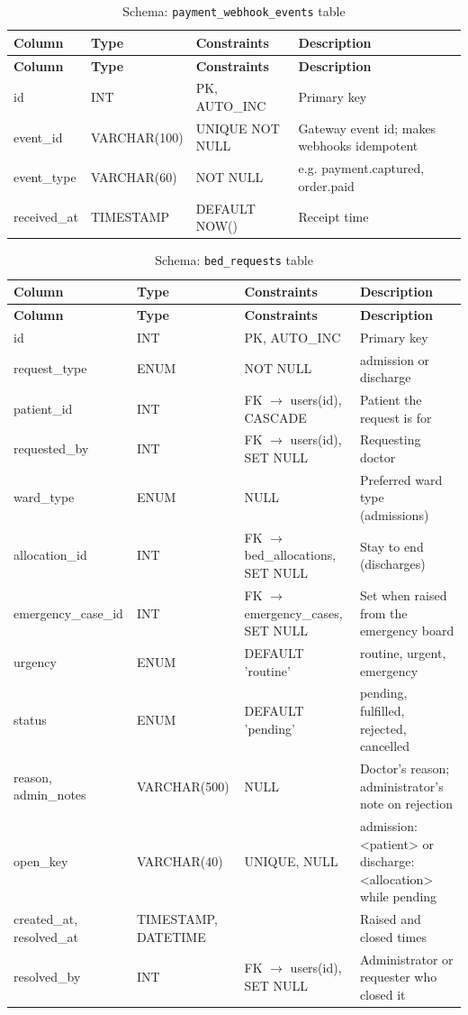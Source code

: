 \begin{longtable}{|L{3.3cm}|L{2.5cm}|L{2.4cm}|L{4.6cm}|}
\caption{Schema: \texttt{payment\_webhook\_events} table} \label{tab:webhook} \\
\hline
\textbf{Column} & \textbf{Type} & \textbf{Constraints} & \textbf{Description} \\
\hline
\endfirsthead
\hline
\textbf{Column} & \textbf{Type} & \textbf{Constraints} & \textbf{Description} \\
\hline
\endhead
\hline
\endfoot
id & INT & PK, AUTO\_INC & Primary key \\
\hline
event\_id & VARCHAR(100) & UNIQUE NOT NULL & Gateway event id; makes webhooks idempotent \\
\hline
event\_type & VARCHAR(60) & NOT NULL & e.g. payment.captured, order.paid \\
\hline
received\_at & TIMESTAMP & DEFAULT NOW() & Receipt time \\
\hline
\end{longtable}
\begin{longtable}{|L{3.3cm}|L{2.5cm}|L{2.4cm}|L{4.6cm}|}
\caption{Schema: \texttt{bed\_requests} table} \label{tab:bedreq} \\
\hline
\textbf{Column} & \textbf{Type} & \textbf{Constraints} & \textbf{Description} \\
\hline
\endfirsthead
\hline
\textbf{Column} & \textbf{Type} & \textbf{Constraints} & \textbf{Description} \\
\hline
\endhead
\hline
\endfoot
id & INT & PK, AUTO\_INC & Primary key \\
\hline
request\_type & ENUM & NOT NULL & admission or discharge \\
\hline
patient\_id & INT & FK $\rightarrow$ users(id), CASCADE & Patient the request is for \\
\hline
requested\_by & INT & FK $\rightarrow$ users(id), SET NULL & Requesting doctor \\
\hline
ward\_type & ENUM & NULL & Preferred ward type (admissions) \\
\hline
allocation\_id & INT & FK $\rightarrow$ bed\_allocations, SET NULL & Stay to end (discharges) \\
\hline
emergency\_case\_id & INT & FK $\rightarrow$ emergency\_cases, SET NULL & Set when raised from the emergency board \\
\hline
urgency & ENUM & DEFAULT 'routine' & routine, urgent, emergency \\
\hline
status & ENUM & DEFAULT 'pending' & pending, fulfilled, rejected, cancelled \\
\hline
reason, admin\_notes & VARCHAR(500) & NULL & Doctor's reason; administrator's note on rejection \\
\hline
open\_key & VARCHAR(40) & UNIQUE, NULL & admission:<patient> or discharge:<allocation> while pending \\
\hline
created\_at, resolved\_at & TIMESTAMP, DATETIME & & Raised and closed times \\
\hline
resolved\_by & INT & FK $\rightarrow$ users(id), SET NULL & Administrator or requester who closed it \\
\hline
\end{longtable}
